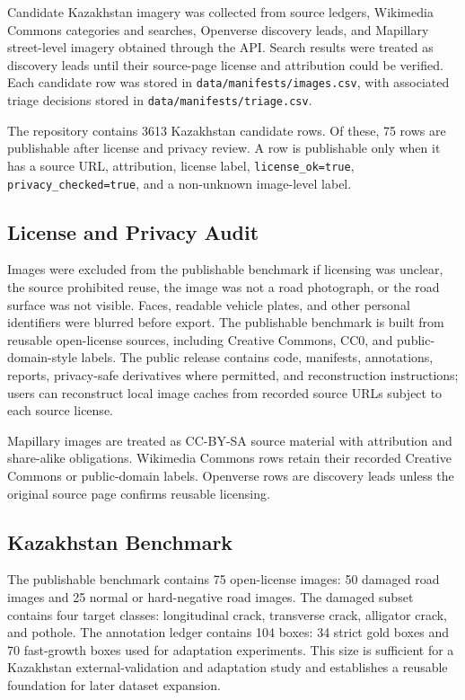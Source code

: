 \documentclass[applsci,article,submit,moreauthors]{Definitions/mdpi}
\begin{document}
Candidate Kazakhstan imagery was collected from source ledgers, Wikimedia Commons categories and searches, Openverse discovery leads, and Mapillary street-level imagery obtained through the API. Search results were treated as discovery leads until their source-page license and attribution could be verified. Each candidate row was stored in \texttt{data/manifests/images.csv}, with associated triage decisions stored in \texttt{data/manifests/triage.csv}.

The repository contains 3613 Kazakhstan candidate rows. Of these, 75 rows are publishable after license and privacy review. A row is publishable only when it has a source URL, attribution, license label, \texttt{license\_ok=true}, \texttt{privacy\_checked=true}, and a non-unknown image-level label.

\subsection{License and Privacy Audit}

Images were excluded from the publishable benchmark if licensing was unclear, the source prohibited reuse, the image was not a road photograph, or the road surface was not visible. Faces, readable vehicle plates, and other personal identifiers were blurred before export. The publishable benchmark is built from reusable open-license sources, including Creative Commons, CC0, and public-domain-style labels. The public release contains code, manifests, annotations, reports, privacy-safe derivatives where permitted, and reconstruction instructions; users can reconstruct local image caches from recorded source URLs subject to each source license.

Mapillary images are treated as CC-BY-SA source material with attribution and share-alike obligations. Wikimedia Commons rows retain their recorded Creative Commons or public-domain labels. Openverse rows are discovery leads unless the original source page confirms reusable licensing.

\subsection{Kazakhstan Benchmark}

The publishable benchmark contains 75 open-license images: 50 damaged road images and 25 normal or hard-negative road images. The damaged subset contains four target classes: longitudinal crack, transverse crack, alligator crack, and pothole. The annotation ledger contains 104 boxes: 34 strict gold boxes and 70 fast-growth boxes used for adaptation experiments. This size is sufficient for a Kazakhstan external-validation and adaptation study and establishes a reusable foundation for later dataset expansion.
\end{document}
